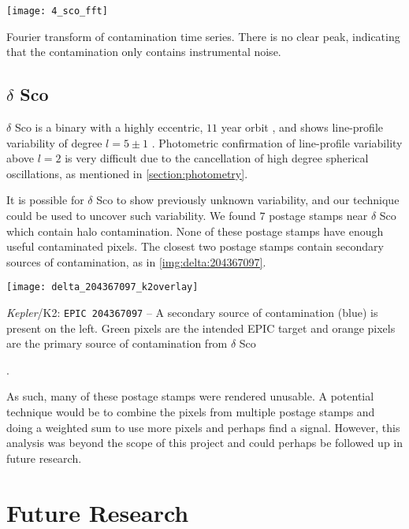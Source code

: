 \documentclass{book}
\begin{document}
\begin{staticfigure}
	\centering
		\texttt{[image: 4\_sco\_fft]}
	\caption{Fourier transform of contamination time series. There is no clear
			 peak, indicating that the contamination only contains instrumental
			 noise.}
	\label{fig:4:fft}
\end{staticfigure}

\subsection{$\delta$ Sco}
\label{section:delta:results}

$\delta$ Sco is a binary with a highly eccentric, $11$ year orbit \citep{1993AJ...106..7688},
and shows line-profile variability of degree $l = 5 \pm 1$ \citep{1998ASPC..135..149T}.
Photometric confirmation of line-profile variability above $l = 2$ is very
difficult due to the cancellation of high degree spherical oscillations, as
mentioned in \autoref{section:photometry}.

It is possible for $\delta$ Sco to show previously unknown variability, and our
technique could be used to uncover such variability. We found $7$ postage stamps
near $\delta$ Sco which contain halo contamination. None of these postage stamps
have enough useful contaminated pixels. The closest two postage stamps contain
secondary sources of contamination, as in \autoref{img:delta:204367097}.

\begin{staticfigure}
	\centering
		\texttt{[image: delta\_204367097\_k2overlay]}
	\caption{\textit{Kepler}/K2: \texttt{EPIC 204367097} -- A secondary source
			 of contamination (blue) is present on the left. Green pixels are the
			 intended EPIC target and orange pixels are the primary source of
			 contamination from $\delta$ Sco}.
	\label{img:delta:204367097}
\end{staticfigure}

As such, many of these postage stamps were rendered unusable. A potential
technique would be to combine the pixels from multiple postage stamps and
doing a weighted sum to use more pixels and perhaps find a signal. However, this
analysis was beyond the scope of this project and could perhaps be followed up
in future research.

\section{Future Research}
\end{document}
